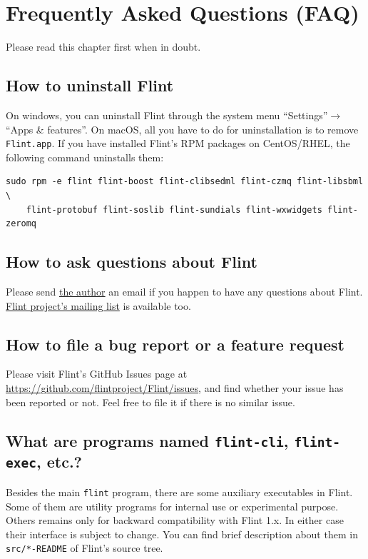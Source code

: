 \documentclass[a4paper,10pt]{report}
\begin{document}
\chapter{Frequently Asked Questions (FAQ)}
\label{sec:orgd12b381}
Please read this chapter first when in doubt.

\section{How to uninstall Flint}
\label{sec:org0126c11}
On windows, you can uninstall Flint through the system menu ``Settings''\(\to\)``Apps \& features''.
On macOS, all you have to do for uninstallation is to remove \texttt{Flint.app}.
If you have installed Flint's RPM packages on CentOS/RHEL, the following command
uninstalls them:
\begin{verbatim}
sudo rpm -e flint flint-boost flint-clibsedml flint-czmq flint-libsbml \
    flint-protobuf flint-soslib flint-sundials flint-wxwidgets flint-zeromq
\end{verbatim}

\section{How to ask questions about Flint}
\label{sec:org3a387a5}
Please send \href{mailto:tabe@fixedpoint.jp}{the author} an email if you happen to have any questions about Flint.
\href{https://groups.google.com/g/flint-discuss}{Flint project's mailing list} is available too.

\section{How to file a bug report or a feature request}
\label{sec:org2dabd27}
Please visit Flint's GitHub Issues page at
\url{https://github.com/flintproject/Flint/issues},
and find whether your issue has been reported or not.
Feel free to file it if there is no similar issue.

\section{What are programs named \texttt{flint-cli}, \texttt{flint-exec}, etc.?}
\label{sec:org1ab2248}
Besides the main \texttt{flint} program, there are some auxiliary executables in
Flint. Some of them are utility programs for internal use or experimental
purpose. Others remains only for backward compatibility with Flint 1.x. In
either case their interface is subject to change. You can find brief description about
them in \texttt{src/*-README} of Flint's source tree.
\end{document}
